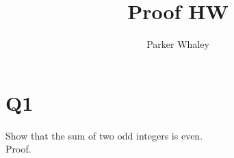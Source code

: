 \documentclass[12pt,a4paper]{article}
\author{Parker Whaley}
\title{Proof HW}
\begin{document}
\maketitle

\section{Q1}
Show that the sum of two odd integers is even.\\
Proof.\\
\end{document}
